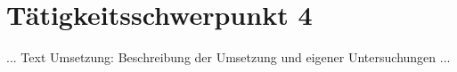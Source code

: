 \chapter{Tätigkeitsschwerpunkt 4}
\label{cha:Tätigkeitsschwerpunkt 4}

... Text Umsetzung: Beschreibung der Umsetzung und eigener Untersuchungen ...